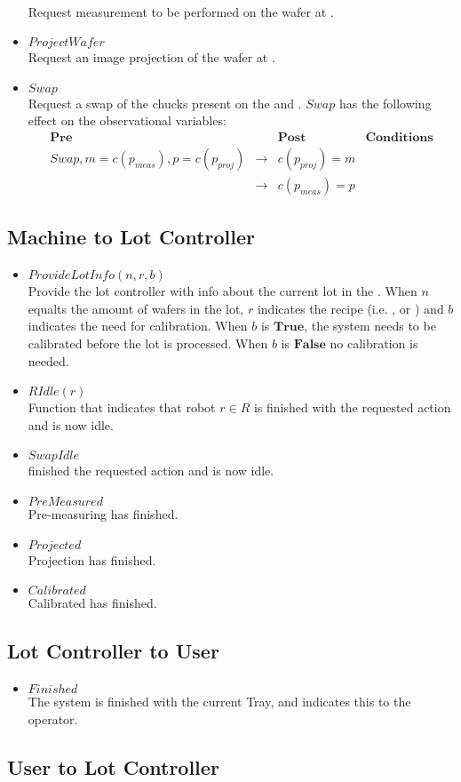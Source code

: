 \begin{itemize}
\\Request measurement to be performed on the wafer at \chuckMeas.
\item $\mathit{ProjectWafer}$
\\Request an image projection of the wafer at \chuckProj.
\item $\mathit{Swap}$
\\Request a swap of the chucks present on the \chuckMeas and \chuckProj.
$\mathit{Swap}$ has the following effect on the observational variables:
\begin{align*}
&\textbf{Pre}&&\textbf{Post}&\textbf{Conditions}&\\
&Swap, m = c(p_\mathit{meas}), p = c(p_\mathit{proj})&\rightarrow&c(p_\mathit{proj}) = m&&\\
&&\rightarrow&c(p_\mathit{meas}) = p&&
\end{align*}
\end{itemize}

\subsection{Machine to Lot Controller}
\begin{itemize}
    \item $\mathit{ProvideLotInfo}(n, r, b)$\\
    Provide the lot controller with info about the current lot in the \tray.
    When $n$ equalts the amount of wafers in the lot, $r$ indicates the recipe (i.e. \recipeOne, \recipeTwo or \recipeThree) and $b$ indicates the need for calibration.
    When $b$ is $\mathbf{True}$, the system needs to be calibrated before the lot is processed.
    When $b$ is $\mathbf{False}$ no calibration is needed.
    \item $\mathit{RIdle(r)}$\\
    Function that indicates that robot $r \in R$ is finished with the requested action and is now idle.
    \item $SwapIdle$\\
    \robotSwap finished the requested action and is now idle.
    \item $\mathit{PreMeasured}$\\
    Pre-measuring has finished.
    \item $\mathit{Projected}$\\
    Projection has finished.
    \item $\mathit{Calibrated}$\\
    Calibrated has finished.
\end{itemize}

\subsection{Lot Controller to User}
\begin{itemize}
    \item $\mathit{Finished}$\\
    The system is finished with the current Tray, and indicates this to the operator.
\end{itemize}

\subsection{User to Lot Controller}

